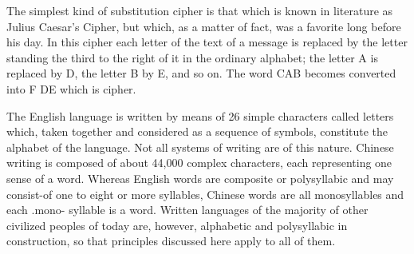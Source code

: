 \mypara The simplest kind of substitution cipher is that which is known in
literature as Julius Caesar’s Cipher, but which, as a matter of fact, was a
favorite long before his day. In this cipher each letter of the text of a
message is replaced by the letter standing the third to the right of it in
the ordinary alphabet; the letter A is replaced by D, the letter B by E,
and so on. The word CAB becomes converted into F DE which is cipher.

\mypara The English language is written by means of 26 simple characters
called letters which, taken together and considered as a sequence of symbols, constitute the alphabet of the language. Not all systems of writing
are of this nature. Chinese writing is composed of about 44,000 complex
characters, each representing one sense of a word. Whereas English
words are composite or polysyllabic and may consist-of one to eight or
more syllables, Chinese words are all monosyllables and each .mono-
syllable is a word. Written languages of the majority of other civilized
peoples of today are, however, alphabetic and polysyllabic in construction,
so that principles discussed here apply to all of them.

